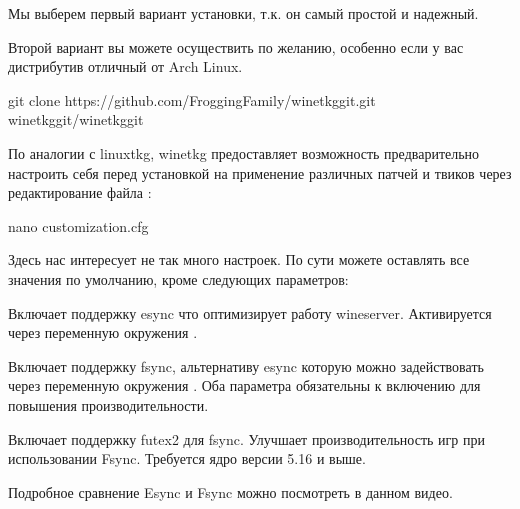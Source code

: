 \documentclass[letterpaper,10pt,russian,openany]{sphinxmanual}
\begin{document}
\sphinxAtStartPar
Мы выберем первый вариант установки, т.к. он самый простой и надежный.

\sphinxAtStartPar
Второй вариант вы можете осуществить по желанию, особенно если у вас дистрибутив отличный от Arch Linux.

\sphinxAtStartPar
{}

\begin{sphinxVerbatim}[commandchars=\\\{\}]
git clone https://github.com/Frogging\PYGZhy{}Family/wine\PYGZhy{}tkg\PYGZhy{}git.git
 wine\PYGZhy{}tkg\PYGZhy{}git/wine\PYGZhy{}tkg\PYGZhy{}git
\end{sphinxVerbatim}

\sphinxAtStartPar
По аналогии с linux\sphinxhyphen{}tkg, wine\sphinxhyphen{}tkg предоставляет возможность предварительно настроить себя перед установкой
на применение различных патчей и твиков через редактирование файла :

\begin{sphinxVerbatim}[commandchars=\\\{\}]
nano customization.cfg
\end{sphinxVerbatim}

\sphinxAtStartPar
Здесь нас интересует не так много настроек.
По сути можете оставлять все значения по умолчанию, кроме следующих параметров:

\sphinxAtStartPar
{} \sphinxhyphen{} Включает поддержку esync что оптимизирует работу wineserver.
Активируется через переменную окружения .

\sphinxAtStartPar
{} \sphinxhyphen{} Включает поддержку fsync, альтернативу esync которую можно задействовать через переменную окружения .
Оба параметра обязательны к включению для повышения производительности.

\sphinxAtStartPar
{} \sphinxhyphen{} Включает поддержку futex2 для fsync. Улучшает производительность игр при использовании Fsync.
Требуется ядро версии 5.16 и выше.

\sphinxAtStartPar
Подробное сравнение Esync и Fsync можно посмотреть в данном видео.

\sphinxAtStartPar
{}
\end{document}
